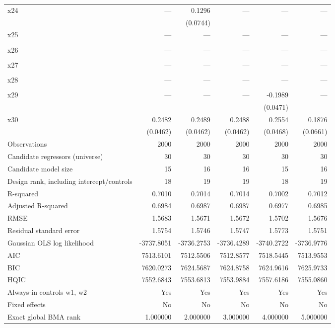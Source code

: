 \begin{longtable}{lrrrrr}
x24 & --- & 0.1296 & --- & --- & --- \\*
 &  & (0.0744) &  &  &  \\
x25 & --- & --- & --- & --- & --- \\*
 &  &  &  &  &  \\
x26 & --- & --- & --- & --- & --- \\*
 &  &  &  &  &  \\
x27 & --- & --- & --- & --- & --- \\*
 &  &  &  &  &  \\
x28 & --- & --- & --- & --- & --- \\*
 &  &  &  &  &  \\
x29 & --- & --- & --- & -0.1989 & --- \\*
 &  &  &  & (0.0471) &  \\
x30 & 0.2482 & 0.2489 & 0.2488 & 0.2554 & 0.1876 \\*
 & (0.0462) & (0.0462) & (0.0462) & (0.0468) & (0.0661) \\
\midrule
Observations & 2000 & 2000 & 2000 & 2000 & 2000 \\
Candidate regressors (universe) & 30 & 30 & 30 & 30 & 30 \\
Candidate model size & 15 & 16 & 16 & 15 & 16 \\
Design rank, including intercept/controls & 18 & 19 & 19 & 18 & 19 \\
R-squared & 0.7010 & 0.7014 & 0.7014 & 0.7002 & 0.7012 \\
Adjusted R-squared & 0.6984 & 0.6987 & 0.6987 & 0.6977 & 0.6985 \\
RMSE & 1.5683 & 1.5671 & 1.5672 & 1.5702 & 1.5676 \\
Residual standard error & 1.5754 & 1.5746 & 1.5747 & 1.5773 & 1.5751 \\
Gaussian OLS log likelihood & -3737.8051 & -3736.2753 & -3736.4289 & -3740.2722 & -3736.9776 \\
AIC & 7513.6101 & 7512.5506 & 7512.8577 & 7518.5445 & 7513.9553 \\
BIC & 7620.0273 & 7624.5687 & 7624.8758 & 7624.9616 & 7625.9733 \\
HQIC & 7552.6843 & 7553.6813 & 7553.9884 & 7557.6186 & 7555.0860 \\
Always-in controls w1, w2 & Yes & Yes & Yes & Yes & Yes \\
Fixed effects & No & No & No & No & No \\
\midrule
Exact global BMA rank & 1.000000 & 2.000000 & 3.000000 & 4.000000 & 5.000000 \\

\end{longtable}
